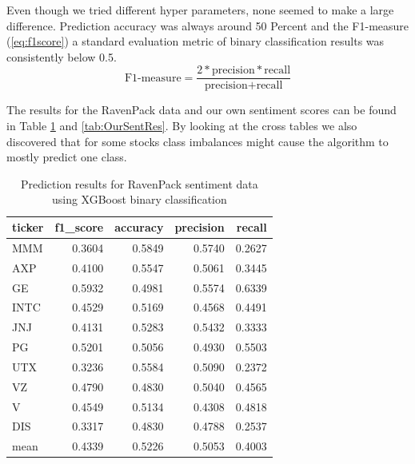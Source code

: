 Even though we tried different hyper parameters, none seemed to make a large difference. Prediction accuracy was always around 50 Percent and the F1-measure (\ref{eq:f1score}) a standard evaluation metric of binary classification results \citep{HADDI201326} was consistently below 0.5.
\begin{equation} 
    \text{F1-measure} = \frac{2*\text{precision} * \text{recall}}{\text{precision} + \text{recall}}
\end{equation}\label{eq:f1score}

The results for the RavenPack data and our own sentiment scores can be found in Table \ref{tab:RavSentRes} and \ref{tab:OurSentRes}. By looking at the cross tables we also discovered that for some stocks class imbalances might cause the algorithm to mostly predict one class. 
\begin{table}[h]
\centering
\small
\begin{tabular}{lrrrr}
\toprule
ticker &  f1\_score &  accuracy &  precision &    recall \\
\midrule
MMM    &  0.3604 &  0.5849 &   0.5740 &  0.2627 \\
AXP    &  0.4100 &  0.5547 &   0.5061 &  0.3445 \\
GE     &  0.5932 &  0.4981 &   0.5574 &  0.6339 \\
INTC   &  0.4529 &  0.5169 &   0.4568 &  0.4491 \\
JNJ    &  0.4131 &  0.5283 &   0.5432 &  0.3333 \\
PG     &  0.5201 &  0.5056 &   0.4930 &  0.5503 \\
UTX    &  0.3236 &  0.5584 &   0.5090 &  0.2372 \\
VZ     &  0.4790 &  0.4830 &   0.5040 &  0.4565 \\
V      &  0.4549 &  0.5134 &   0.4308 &  0.4818 \\
DIS    &  0.3317 &  0.4830 &   0.4788 &  0.2537 \\
\midrule
mean & 0.4339 & 0.5226 & 0.5053 & 0.4003 \\
\bottomrule
\end{tabular}
    \caption{Prediction results for RavenPack sentiment data using XGBoost binary classification}
    \label{tab:RavSentRes}
\end{table}
%
